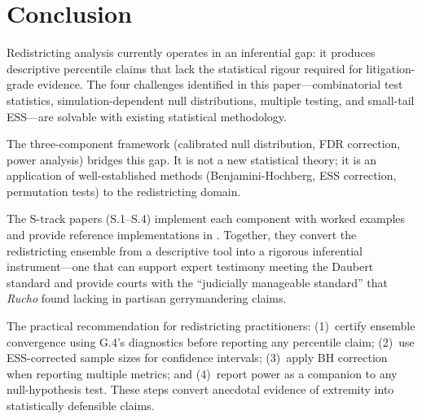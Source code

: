 \section{Conclusion}
\label{sec:conclusion}

Redistricting analysis currently operates in an inferential gap:
it produces descriptive percentile claims that lack the statistical
rigour required for litigation-grade evidence.
The four challenges identified in this paper---combinatorial test statistics,
simulation-dependent null distributions, multiple testing, and small-tail
ESS---are solvable with existing statistical methodology.

The three-component framework (calibrated null distribution, FDR correction,
power analysis) bridges this gap.
It is not a new statistical theory; it is an application of well-established
methods (Benjamini-Hochberg, ESS correction, permutation tests) to the
redistricting domain.

The S-track papers (S.1--S.4) implement each component with worked examples
and provide reference implementations in \bisect{}.
Together, they convert the redistricting ensemble from a descriptive tool
into a rigorous inferential instrument---one that can support expert
testimony meeting the Daubert standard and provide courts with the
``judicially manageable standard'' that \textit{Rucho} found lacking
in partisan gerrymandering claims.

The practical recommendation for redistricting practitioners:
(1)~certify ensemble convergence using G.4's diagnostics before
reporting any percentile claim; (2)~use ESS-corrected sample sizes
for confidence intervals; (3)~apply BH correction when reporting
multiple metrics; and (4)~report power as a companion to any
null-hypothesis test.
These steps convert anecdotal evidence of extremity into statistically
defensible claims.
